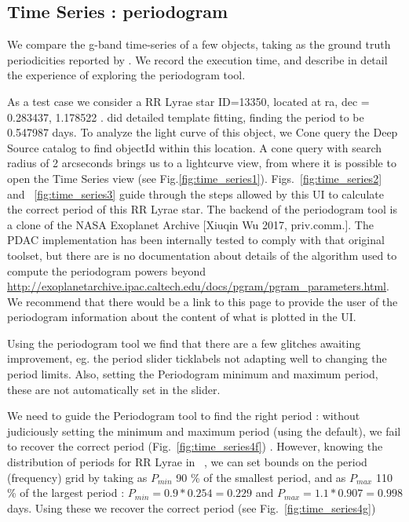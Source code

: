 \documentclass[fleqn,usenatbib]{mnras} %
\begin{document}
\subsection{Time Series : periodogram}
\label{sec:periodogram}

We compare the g-band time-series of a few objects, taking as the ground truth periodicities reported by \cite{sesar2010}. We record the execution time, and describe in detail the experience of exploring the periodogram tool.   

As a test case we consider a RR Lyrae star ID=13350, located at  ra, dec = 0.283437, 1.178522 \degree. \cite{sesar2010} did detailed template fitting, finding the period to be 0.547987 days.
To analyze the light curve of this object, we Cone query the Deep Source catalog to find objectId within this location. 
 A cone query with search radius of 2 arcseconds brings us to a lightcurve view, from where it is possible to open the Time Series view (see Fig.\ref{fig:time_series1}). Figs.~\ref{fig:time_series2} and ~\ref{fig:time_series3} guide through the steps allowed by this UI to calculate the correct period of this RR Lyrae star.  The backend of the periodogram tool is a clone of the NASA Exoplanet Archive [Xiuqin Wu 2017, priv.comm.]. The PDAC implementation has been internally tested to comply with that original toolset, but there are is no documentation about details of the algorithm used to compute the periodogram powers beyond  \url{http://exoplanetarchive.ipac.caltech.edu/docs/pgram/pgram_parameters.html}. We recommend that there would be a link to this page to provide the user of the periodogram information about the content of what is plotted in the UI. 

Using the periodogram tool we find that there are a few glitches awaiting improvement, eg. the period slider ticklabels not adapting well to changing the period limits. Also, setting the Periodogram minimum and maximum period, these are not automatically set in the slider.  

We need to guide the Periodogram tool to find the right period : without judiciously setting the minimum and maximum period (using the default), we fail to recover the correct period  (Fig.~\ref{fig:time_series4f}) .  However, knowing the distribution of periods for RR Lyrae in ~\cite{sesar2010}, we can set bounds on the period (frequency) grid by taking as $P_{min}$ 90 \% of the smallest period, and as $P_{max}$  110 \% of the largest period :  $P_{min} = 0.9 * 0.254 = 0.229 $ and  $P_{max} = 1.1 * 0.907 = 0.998 $ days.  Using these we recover the correct period (see Fig.~\ref{fig:time_series4g})
\end{document}
